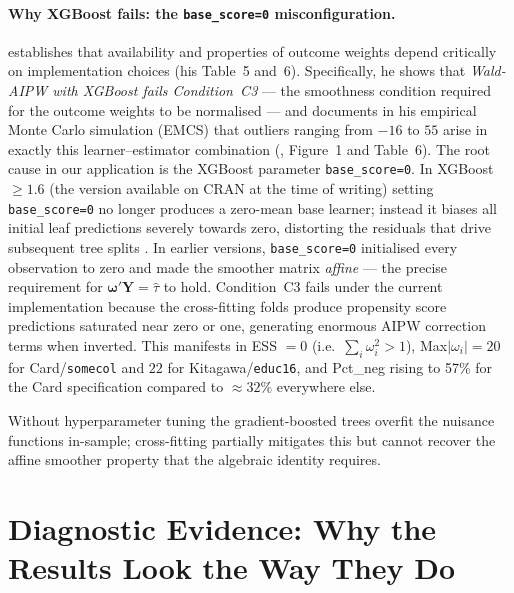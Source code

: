 \documentclass[12pt]{article}
\begin{document}
\paragraph{Why XGBoost fails: the \texttt{base\_score=0} misconfiguration.}
\citet{knaus2024treatment} establishes that availability and properties of outcome
weights depend critically on implementation choices (his Table~5 and~6).
Specifically, he shows that \emph{Wald-AIPW with XGBoost fails
Condition~C3} --- the smoothness condition required for the outcome
weights to be normalised --- and documents in his empirical Monte Carlo
simulation (EMCS) that outliers ranging from $-16$ to $55$ arise in
exactly this learner--estimator combination
(\citealt{knaus2024treatment}, Figure~1 and Table~6).
The root cause in our application is the XGBoost parameter
\texttt{base\_score=0}. In XGBoost $\geq 1.6$ (the version available on
CRAN at the time of writing) setting \texttt{base\_score=0} no longer
produces a zero-mean base learner; instead it biases all initial leaf
predictions severely towards zero, distorting the residuals that drive
subsequent tree splits \citep{knaus2024treatment}.
In earlier versions, \texttt{base\_score=0} initialised every
observation to zero and made the smoother matrix \emph{affine} --- the
precise requirement for $\boldsymbol{\omega}'\mathbf{Y} = \hat\tau$ to
hold. Condition~C3 fails under the current implementation because the
cross-fitting folds produce propensity score predictions saturated near
zero or one, generating enormous AIPW correction terms when inverted.
This manifests in ESS $= 0$ (i.e.\ $\sum_i\omega_i^2 > 1$),
Max$|\omega_i| = 20$ for Card/\texttt{somecol} and $22$ for
Kitagawa/\texttt{educ16}, and Pct\_neg rising to 57\% for the Card
specification compared to $\approx 32\%$ everywhere else.

Without hyperparameter tuning the gradient-boosted trees overfit the
nuisance functions in-sample; cross-fitting partially mitigates this but
cannot recover the affine smoother property that the algebraic identity
requires. 





\section*{Diagnostic Evidence: Why the Results Look the Way They Do}
\end{document}
